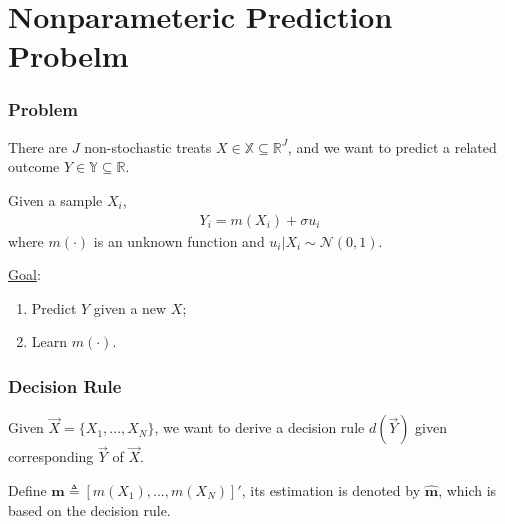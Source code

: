 \documentclass[11pt]{elegantbook}
\begin{document}
\chapter{Nonparameteric Prediction Probelm}
\subsection*{Problem}
There are $J$ non-stochastic treats $X\in \mathbb{X}\subseteq \mathbb{R}^J$, and we want to predict a related outcome $Y\in \mathbb{Y}\subseteq \mathbb{R}$.

Given a sample $X_i$,
\begin{equation}
    \begin{aligned}
        Y_i=m(X_i)+\sigma u_i
    \end{aligned}
    \nonumber
\end{equation}
where $m(\cdot)$ is an unknown function and $u_i|X_i\sim \mathcal{N}(0,1)$.

\underline{Goal}:
\begin{enumerate}[$\circ$]
    \item Predict $Y$ given a new $X$;
    \item Learn $m(\cdot)$.
\end{enumerate}

\subsection*{Decision Rule}
Given $\vec{X}=\{X_1,...,X_N\}$, we want to derive a decision rule $d(\vec{Y})$ given corresponding $\vec{Y}$ of $\vec{X}$.

Define $\boldsymbol{m}\triangleq \left[m(X_1),...,m(X_N)\right]'$, its estimation is denoted by $\hat{\boldsymbol{m}}$, which is based on the decision rule.
\end{document}
